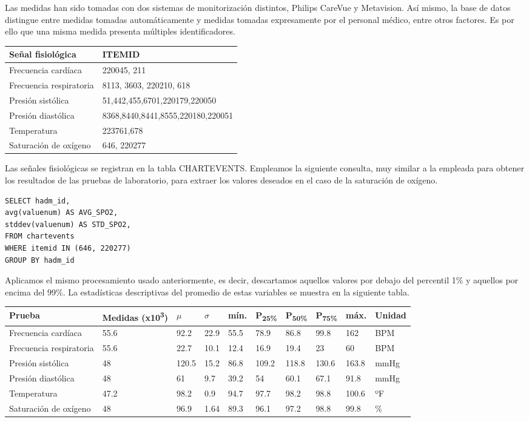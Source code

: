 \documentclass{report}
\begin{document}
Las medidas han sido tomadas con dos sistemas de monitorización
distintos, Philips CareVue y Metavision. Así mismo, la base de datos
distingue entre medidas tomadas automáticamente y medidas tomadas
expresamente por el personal médico, entre otros factores. Es por ello
que una misma medida presenta múltiples identificadores.

\begin{longtable}[]{@{}ll@{}}
\toprule
Señal fisiológica & ITEMID\tabularnewline
\midrule
\endhead
Frecuencia cardíaca & 220045, 211\tabularnewline
Frecuencia respiratoria & 8113, 3603, 220210, 618\tabularnewline
Presión sistólica & 51,442,455,6701,220179,220050\tabularnewline
Presión diastólica & 8368,8440,8441,8555,220180,220051\tabularnewline
Temperatura & 223761,678\tabularnewline
Saturación de oxígeno & 646, 220277\tabularnewline
\bottomrule
\end{longtable}

Las señales fisiológicas se registran en la tabla CHARTEVENTS. Empleamos
la siguiente consulta, muy similar a la empleada para obtener los
resultados de las pruebas de laboratorio, para extraer los valores
deseados en el caso de la saturación de oxígeno.

\begin{verbatim}
SELECT hadm_id,
avg(valuenum) AS AVG_SPO2,
stddev(valuenum) AS STD_SPO2,
FROM chartevents
WHERE itemid IN (646, 220277)
GROUP BY hadm_id
\end{verbatim}

Aplicamos el mismo procesamiento usado anteriormente, es decir, descartamos aquellos valores por debajo del percentil 1\% y aquellos por encima del 99\%. La estadísticas descriptivas del promedio de estas variables se muestra en la siguiente tabla.
\begin{longtable}[]{@{}llllllllll@{}}
\toprule
Prueba  & Medidas (x10\textsuperscript{3}) & $\mu$ &
$\sigma$ & mín. &  P\textsubscript{25\%} & 
 P\textsubscript{50\%} &   P\textsubscript{75\%} & máx. & Unidad \tabularnewline
\midrule
\endhead
Frecuencia cardíaca & 55.6 & 92.2 & 22.9 & 55.5 & 78.9 & 86.8 & 99.8 &
162 & BPM\tabularnewline
Frecuencia respiratoria & 55.6 & 22.7 & 10.1 & 12.4 & 16.9 & 19.4 & 23 &
60 & BPM\tabularnewline
Presión sistólica & 48 & 120.5 & 15.2 & 86.8 & 109.2 & 118.8 & 130.6 &
163.8 & mmHg\tabularnewline
Presión diastólica & 48 & 61 & 9.7 & 39.2 & 54 & 60.1 & 67.1 & 91.8 &
mmHg\tabularnewline
Temperatura & 47.2 & 98.2 & 0.9 & 94.7 & 97.7 & 98.2 & 98.8 & 100.6 &
ºF\tabularnewline
Saturación de oxígeno & 48 & 96.9 & 1.64 & 89.3 & 96.1 & 97.2 & 98.8 &
99.8 & \%\tabularnewline
\bottomrule
\end{longtable}
\end{document}
